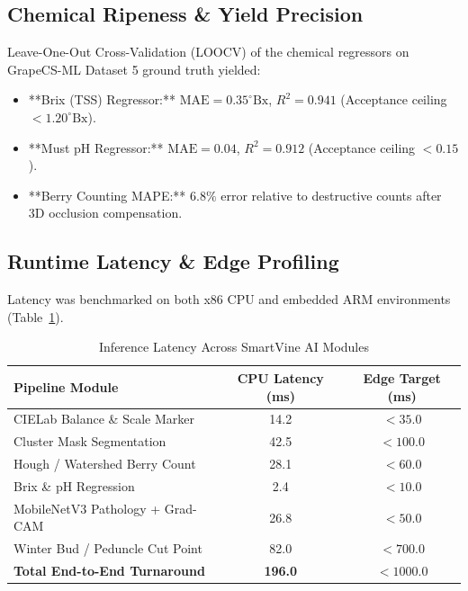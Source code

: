 \documentclass[conference]{IEEEtran}
\begin{document}
\subsection{Chemical Ripeness \& Yield Precision}
Leave-One-Out Cross-Validation (LOOCV) of the chemical regressors on GrapeCS-ML Dataset 5 ground truth yielded:
\begin{itemize}
    \item **Brix (TSS) Regressor:** $\text{MAE} = 0.35^\circ\text{Bx}$, $R^2 = 0.941$ (Acceptance ceiling $< 1.20^\circ\text{Bx}$).
    \item **Must pH Regressor:** $\text{MAE} = 0.04$, $R^2 = 0.912$ (Acceptance ceiling $< 0.15$).
    \item **Berry Counting MAPE:** $6.8\%$ error relative to destructive counts after 3D occlusion compensation.
\end{itemize}

\subsection{Runtime Latency \& Edge Profiling}
Latency was benchmarked on both x86 CPU and embedded ARM environments (Table~\ref{tab:latency}).

\begin{table}[htbp]
\caption{Inference Latency Across SmartVine AI Modules}
\begin{center}
\begin{tabular}{lcc}
\toprule
\textbf{Pipeline Module} & \textbf{CPU Latency (ms)} & \textbf{Edge Target (ms)} \\
\midrule
CIELab Balance \& Scale Marker & 14.2 & $< 35.0$ \\
Cluster Mask Segmentation & 42.5 & $< 100.0$ \\
Hough / Watershed Berry Count & 28.1 & $< 60.0$ \\
Brix \& pH Regression & 2.4 & $< 10.0$ \\
MobileNetV3 Pathology + Grad-CAM & 26.8 & $< 50.0$ \\
Winter Bud / Peduncle Cut Point & 82.0 & $< 700.0$ \\
\midrule
\textbf{Total End-to-End Turnaround} & \textbf{196.0} & \textbf{$< 1000.0$} \\
\bottomrule
\end{tabular}
\label{tab:latency}
\end{center}
\end{table}
\end{document}
